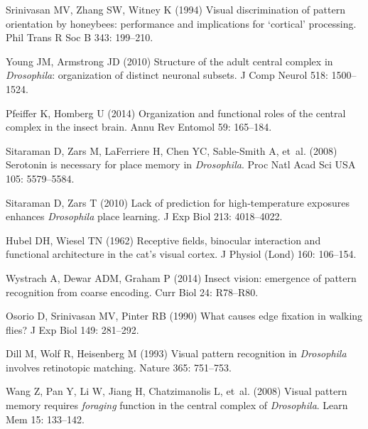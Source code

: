 \begin{thebibliography}{10}
	Srinivasan MV, Zhang SW, Witney K (1994) Visual discrimination of pattern
	orientation by honeybees: performance and implications for `cortical'
	processing.
	\newblock Phil Trans R Soc B 343: 199--210.
	
	Young JM, Armstrong JD (2010) Structure of the adult central complex in
	\emph{Drosophila}: organization of distinct neuronal subsets.
	\newblock J Comp Neurol 518: 1500--1524.
	
	Pfeiffer K, Homberg U (2014) Organization and functional roles of the central
	complex in the insect brain.
	\newblock Annu Rev Entomol 59: 165--184.
	
	Sitaraman D, Zars M, LaFerriere H, Chen YC, Sable-Smith A, et~al. (2008)
	Serotonin is necessary for place memory in \emph{Drosophila}.
	\newblock Proc Natl Acad Sci USA 105: 5579--5584.
	
	Sitaraman D, Zars T (2010) Lack of prediction for high-temperature exposures
	enhances \emph{Drosophila} place learning.
	\newblock J Exp Biol 213: 4018--4022.
	
	Hubel DH, Wiesel TN (1962) Receptive fields, binocular interaction and
	functional architecture in the cat's visual cortex.
	\newblock J Physiol (Lond) 160: 106--154.
	
	Wystrach A, Dewar ADM, Graham P (2014) Insect vision: emergence of pattern
	recognition from coarse encoding.
	\newblock Curr Biol 24: R78--R80.
	
	Osorio D, Srinivasan MV, Pinter RB (1990) What causes edge fixation in walking
	flies?
	\newblock J Exp Biol 149: 281--292.
	
	Dill M, Wolf R, Heisenberg M (1993) Visual pattern recognition in
	\emph{Drosophila} involves retinotopic matching.
	\newblock Nature 365: 751--753.
	
	Wang Z, Pan Y, Li W, Jiang H, Chatzimanolis L, et~al. (2008) Visual pattern
	memory requires \emph{foraging} function in the central complex of
	\emph{Drosophila}.
	\newblock Learn Mem 15: 133--142.
	

\end{thebibliography}
